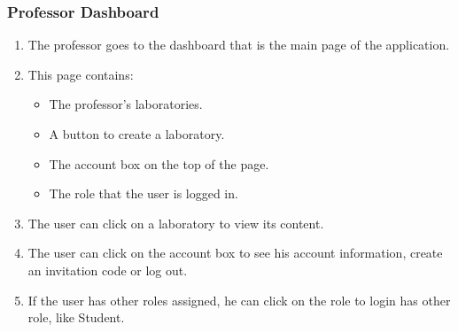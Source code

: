 \subsubsection{Professor Dashboard}

\begin{enumerate}
    \item The professor goes to the dashboard that is the main page of the application.
    \item This page contains:
    \begin{itemize}
        \item The professor's laboratories. 
        \item A button to create a laboratory.
        \item The account box on the top of the page.
        \item The role that the user is logged in.
    \end{itemize}
    \item The user can click on a laboratory to view its content.
    \item The user can click on the account box to see his account information, create an invitation code or log out.
    \item If the user has other roles assigned, he can click on the role to login has other role, like Student.
\end{enumerate}
